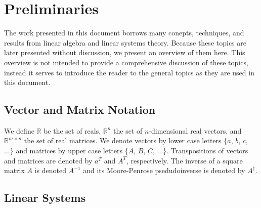 \chapter{Preliminaries}
The work presented in this document borrows many conepts, techniques, and results from linear algebra and linear systems theory. Because these topics are later presented without discussion, we present an overview of them here. This overview is not intended to provide a comprehensive discussion of these topics, instead it serves to introduce the reader to the general topics as they are used in this document.

\section{Vector and Matrix Notation}
We define $\mathbb{R}$ be the set of reals, $\mathbb{R}^n$ the set of $n$-dimensional real vectors, and $\mathbb{R}^{m\times n}$ the set of real matrices. We denote vectors by lower case letters $\{a$, $b$, $c$, $\dots\}$ and matrices by upper case letters $\{A$, $B$, $C$, $\dots\}$. Transpositions of vectors and matrices are denoted by $a^T$ and $A^T$, respectively. The inverse of a square matrix $A$ is denoted $A^{-1}$ and its Moore-Penrose psedudoinverse is denoted by $A^\dagger$.

\section{Linear Systems}
